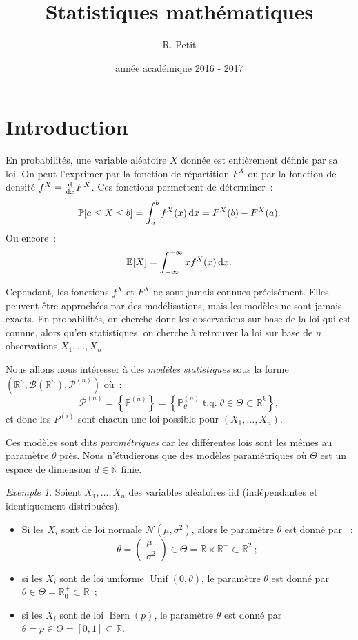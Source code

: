 \documentclass{report}
\title{Statistiques mathématiques}
\author{R. Petit}
\date{année académique 2016 - 2017}
\DeclareMathOperator{\tq}{\text{ t.q. }}
\DeclareMathOperator{\Unif}{Unif}  %
\DeclareMathOperator{\Bern}{Bern}  %
\renewcommand{\P}{\mathbb P}
\newcommand{\E}{\mathbb E}
\newcommand{\minfty}{{-\infty}}
\newcommand{\pinfty}{{+\infty}}
\newcommand{\statmod}[4]{\left(#1^{#4}, #2\left(#1^{#4}\right), #3^{\left(#4\right)}\right)}
\newcommand{\Nms}{\mathcal N(\mu, \sigma^2)}
\newcommand{\vvp}[2]{\begin{pmatrix}#1 \\ #2\end{pmatrix}}
\newcommand{\N}{\mathbb N}
\newcommand{\R}{\mathbb R}
\newcommand{\Brl}{\mathcal B}  %
\theoremstyle{definition}
\theoremstyle{remark}
\newtheorem{ex}{Exemple}[chapter]
\begin{document}
\maketitle
\tableofcontents
\newpage
\setcounter{page}{1}

\chapter*{Introduction}
	En probabilités, une variable aléatoire $X$ donnée est entièrement définie par sa loi. On peut l'exprimer par la fonction de répartition $F^X$ ou par la
	fonction de densité $f^X = \od {}xF^X$. Ces fonctions permettent de déterminer~:
	\[\P[a \leq X \leq b] = \int_a^bf^X(x)\dif x = F^X(b) - F^X(a).\]
	Ou encore~:
	\[\E[X] = \int_\minfty^\pinfty xf^X(x)\dif x.\]

	Cependant, les fonctions $f^X$ et $F^X$ ne sont jamais connues précisément. Elles peuvent être approchées par des modélisations, mais les modèles ne sont
	jamais exacts. En probabilités, on cherche donc les observations sur base de la loi qui est connue, alors qu'en statistiques, on cherche à retrouver la loi
	sur base de $n$ observations $X_1, \ldots, X_n$.

	Nous allons nous intéresser à des \textit{modèles statistiques} sous la forme $\statmod \R\Brl{\mathcal P}n$ où~:
	\[\mathcal P^{(n)} = \left\{\P^{(n)}\right\} = \left\{\P^{(n)}_\theta \tq \theta \in \Theta \subset \R^k\right\},\]
	et donc les $P^{(i)}$ sont chacun une loi possible pour $(X_1, \ldots, X_n)$.

	Ces modèles sont dits \textit{paramétriques} car les différentes lois sont les mêmes au paramètre $\theta$ près. Nous n'étudierons que des modèles
	paramétriques où $\Theta$ est un espace de dimension $d \in \N$ finie.

	\begin{ex} Soient $X_1,\ldots, X_n$ des variables aléatoires iid (indépendantes et identiquement distribuées).
	\begin{itemize}
		\item Si les $X_i$ sont de loi normale $\Nms$, alors le paramètre $\theta$ est donné par ~:
		      \[\theta = \vvp \mu{\sigma^2} \in \Theta = \R \times \R^+ \subset \R^2~;\]
		\item si les $X_i$ sont de loi uniforme $\Unif(0, \theta)$, le paramètre $\theta$ est donné par $\theta \in \Theta = \R_0^+ \subset \R$~;
		\item si les $X_i$ sont de loi $\Bern(p)$, le paramètre $\theta$ est donné par $\theta = p \in \Theta = [0, 1] \subset \R$.
	\end{itemize}
	\end{ex}
\end{document}
